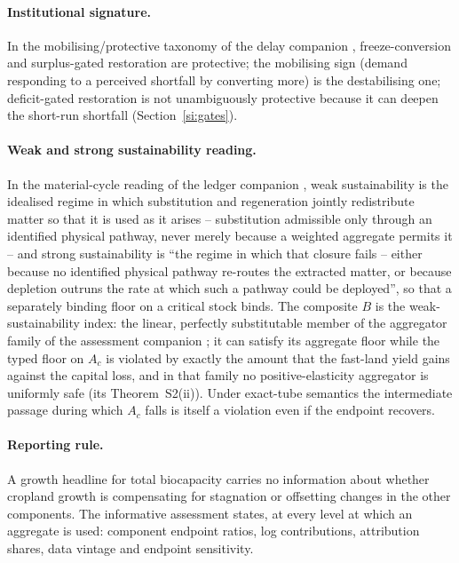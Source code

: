 \documentclass[11pt,a4paper]{article}
\begin{document}
\paragraph{Institutional signature.} In the mobilising/protective taxonomy of the delay companion \citep{Abaee2026a}, freeze-conversion and surplus-gated restoration are protective; the mobilising sign (demand responding to a perceived shortfall by converting more) is the destabilising one; deficit-gated restoration is not unambiguously protective because it can deepen the short-run shortfall (Section~\ref{si:gates}).

\paragraph{Weak and strong sustainability reading.} In the material-cycle reading of the ledger companion \citep{Abaee2026c}, weak sustainability is the idealised regime in which substitution and regeneration jointly redistribute matter so that it is used as it arises -- substitution admissible only through an identified physical pathway, never merely because a weighted aggregate permits it -- and strong sustainability is ``the regime in which that closure fails -- either because no identified physical pathway re-routes the extracted matter, or because depletion outruns the rate at which such a pathway could be deployed'', so that a separately binding floor on a critical stock binds. The composite $B$ is the weak-sustainability index: the linear, perfectly substitutable member of the aggregator family of the assessment companion \citep[Lemma~A of][]{Abaee2026b}; it can satisfy its aggregate floor while the typed floor on $A_c$ is violated by exactly the amount that the fast-land yield gains against the capital loss, and in that family no positive-elasticity aggregator is uniformly safe (its Theorem~S2(ii)). Under exact-tube semantics the intermediate passage during which $A_c$ falls is itself a violation even if the endpoint recovers.

\paragraph{Reporting rule.} A growth headline for total biocapacity carries no information about whether cropland growth is compensating for stagnation or offsetting changes in the other components. The informative assessment states, at every level at which an aggregate is used: component endpoint ratios, log contributions, attribution shares, data vintage and endpoint sensitivity.
\end{document}
